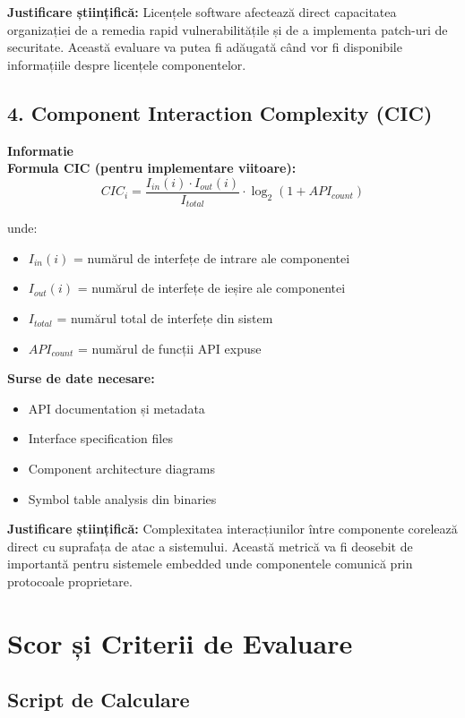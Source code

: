 \documentclass[12pt,a4paper]{article}
\newenvironment{infobox}{%
\begin{leftbar}
\color{black}
\textbf{Informatie}\\[0.5em]
}{%
\end{leftbar}
}
\begin{document}
\textbf{Justificare științifică:} Licențele software afectează direct capacitatea organizației de a remedia rapid vulnerabilitățile și de a implementa patch-uri de securitate. Această evaluare va putea fi adăugată când vor fi disponibile informațiile despre licențele componentelor.

\subsection{4. Component Interaction Complexity (CIC)}

\begin{infobox}
\textbf{Formula CIC (pentru implementare viitoare):}
\[CIC_i = \frac{I_{in}(i) \cdot I_{out}(i)}{I_{total}} \cdot \log_2(1 + API_{count})\]

unde:
\begin{itemize}
\item $I_{in}(i)$ = numărul de interfețe de intrare ale componentei
\item $I_{out}(i)$ = numărul de interfețe de ieșire ale componentei
\item $I_{total}$ = numărul total de interfețe din sistem
\item $API_{count}$ = numărul de funcții API expuse
\end{itemize}

\textbf{Surse de date necesare:}
\begin{itemize}
\item API documentation și metadata
\item Interface specification files
\item Component architecture diagrams
\item Symbol table analysis din binaries
\end{itemize}
\end{infobox}

\textbf{Justificare științifică:} Complexitatea interacțiunilor între componente corelează direct cu suprafața de atac a sistemului. Această metrică va fi deosebit de importantă pentru sistemele embedded unde componentele comunică prin protocoale proprietare.

\section{Scor și Criterii de Evaluare}

\subsection{Script de Calculare}
\end{document}
